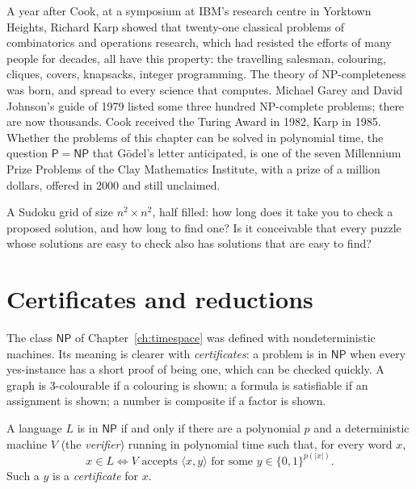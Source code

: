 A year after Cook, at a symposium at IBM's research centre in Yorktown Heights, Richard Karp showed that twenty-one classical problems of combinatorics and operations research, which had resisted the efforts of many people for decades, all have this property: the travelling salesman, colouring, cliques, covers, knapsacks, integer programming. The theory of NP-completeness was born, and spread to every science that computes. Michael Garey and David Johnson's guide of 1979 listed some three hundred NP-complete problems; there are now thousands. Cook received the Turing Award in 1982, Karp in 1985. Whether the problems of this chapter can be solved in polynomial time, the question $\mathsf P=\mathsf{NP}$ that Gödel's letter anticipated, is one of the seven Millennium Prize Problems of the Clay Mathematics Institute, with a prize of a million dollars, offered in 2000 and still unclaimed.

\begin{think}
A Sudoku grid of size $n^2\times n^2$, half filled: how long does it take you to check a proposed solution, and how long to find one? Is it conceivable that every puzzle whose solutions are easy to check also has solutions that are easy to find?
\end{think}

\section{Certificates and reductions}\label{sec:certificates}

The class $\mathsf{NP}$ of Chapter~\ref{ch:timespace} was defined with nondeterministic machines. Its meaning is clearer with \emph{certificates}: a problem is in $\mathsf{NP}$ when every yes-instance has a short proof of being one, which can be checked quickly. A graph is $3$-colourable if a colouring is shown; a formula is satisfiable if an assignment is shown; a number is composite if a factor is shown.

\begin{proposition}\label{prop:certificates}
A language $L$ is in $\mathsf{NP}$ if and only if there are a polynomial $p$ and a deterministic machine $V$ (the \emph{verifier}) running in polynomial time such that, for every word $x$,
\[
x\in L\iff V\text{ accepts }\langle x,y\rangle\text{ for some }y\in\{0,1\}^{p(|x|)}.
\]
Such a $y$ is a \emph{certificate} for $x$.
\end{proposition}

